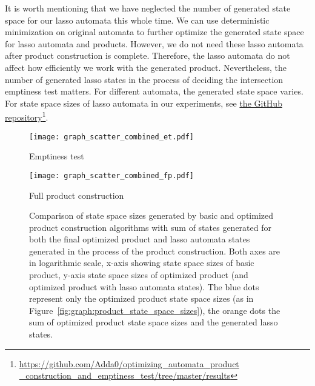 It is worth mentioning that we have neglected the number of generated state space for our lasso automata this whole time. We can use deterministic minimization on original automata to further optimize the generated state space for lasso automata and products. However, we do not need these lasso automata after product construction is complete. Therefore, the lasso automata do not affect how efficiently we work with the generated product. Nevertheless, the number of generated lasso states in the process of deciding the intersection emptiness test matters. For different automata, the generated state space varies. For state space sizes of lasso automata in our experiments, see \href{https://github.com/Adda0/optimizing_automata_product_construction_and_emptiness_test/tree/master/results}{the GitHub repository}\footnote{{\href{https://github.com/Adda0/optimizing_automata_product_construction_and_emptiness_test/tree/master/results}{https://github.com/Adda0/optimizing\_automata\_product\\\_construction\_and\_emptiness\_test/tree/master/results}}}.

\begin{figure*}[ht]
    \centering
    \begin{minipage}{0.49\linewidth}
        \centering
        \texttt{[image: graph\_scatter\_combined\_et.pdf]}
        \caption{Emptiness test}
        \label{fig:graph:et_state_space_sizes_comp_with_lasso}
    \end{minipage}
    \hfill
    \begin{minipage}{0.49\linewidth}
        \centering
        \texttt{[image: graph\_scatter\_combined\_fp.pdf]}
        \caption{Full product construction}
        \label{fig:graph:fp_state_space_sizes_comp_with_lasso}
    \end{minipage}
    \vspace{0.5cm}
    \caption{Comparison of state space sizes generated by basic and optimized product construction algorithms with sum of states generated for both the final optimized product and lasso automata states generated in the process of the product construction. Both axes are in logarithmic scale, x-axis showing state space sizes of basic product, y-axis state space sizes of optimized product (and optimized product with lasso automata states). The blue dots represent only the optimized product state space sizes (as in Figure~\ref{fig:graph:product_state_space_sizes}), the orange dots the sum of optimized product state space sizes and the generated lasso states.}
    \label{fig:graph:product_state_space_sizes_with_lasso}
\end{figure*}

